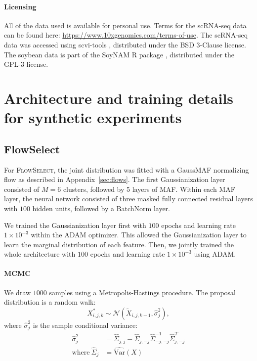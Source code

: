 \documentclass{article}
\newcommand{\FlowSelect}{\textsc{FlowSelect}\xspace}
\begin{document}
\paragraph{Licensing} All of the data used is available for personal use.
Terms for the scRNA-seq data can be found here: \url{https://www.10xgenomics.com/terms-of-use}.
The scRNA-seq data was accessed using scvi-tools \citep{Gayoso2021scvitools}, distributed under the
BSD 3-Clause license.
The soybean data is part of the SoyNAM R package \citep{soynam}, distributed under the GPL-3 license.


\section{Architecture and training details for synthetic experiments}

\subsection{FlowSelect}

For \FlowSelect, the joint distribution was fitted with a GaussMAF normalizing flow as described in Appendix~\ref{sec:flows}.
The first Gaussianization layer consisted of $M=6$ clusters, followed by 5 layers of MAF.
Within each MAF layer, the neural network consisted of three masked fully connected residual layers with $100$ hidden units, followed by a BatchNorm layer.

We trained the Gaussianization layer first with $100$ epochs and learning rate $1 \times 10^{-3}$ within the ADAM optimizer. This allowed the Gaussianization layer to learn the marginal distribution of each feature.
Then, we jointly trained the whole architecture with $100$ epochs and learning rate $1 \times 10^{-3}$ using ADAM.

\paragraph{MCMC} We draw $1000$ samples using a Metropolis-Hastings procedure.
The proposal distribution is a random walk:
\begin{equation*}
  \label{eq:mcmc_random_walk}
  X_{i,j,k}^{*} \sim \mathcal N(\tilde X_{i,j,k-1}, \hat \sigma_{j}^{2}),
\end{equation*}
where $\hat \sigma_{j}^{2}$ is the sample conditional variance:
\begin{equation*}
  \begin{split}
    \hat \sigma_{j}^{2} &= \hat \Sigma_{j, j} - \hat \Sigma_{j, -j} \hat \Sigma_{-j, -j}^{-1} \hat \Sigma_{j, -j}^{T} \\
    \text{where}~\hat \Sigma_{j} &= \widehat{\text{Var}}(X)
\end{split}
\end{equation*}
\end{document}
